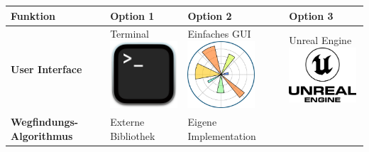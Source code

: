 \documentclass[../main.tex]{subfiles}
\begin{document}
\begin{table}[htbp!]
    \centering
    \begin{tabularx}{\textwidth}{| X | Y | Y | Y |}
        \hline

        \textbf{Funktion} & \textbf{Option 1} & \textbf{Option 2} & \textbf{Option 3} \\ \hline
        
        \textbf{User Interface} &     
        Terminal \newline
        \includegraphics[width=2.5cm]{img/simulation/morphologischer-kasten/terminal.png}
        &
        Einfaches GUI \newline
        \includegraphics[width=2.5cm]{img/simulation/morphologischer-kasten/simple-gui.png}
        &
        Unreal Engine \newline
        \includegraphics[width=2.5cm]{img/simulation/morphologischer-kasten/unreal-engine-logo.png}
        \\ \hline
        
        \textbf{Wegfindungs-Algorithmus}  &
        Externe Bibliothek &
        Eigene Implementation &
        \\ \hline
        

\end{tabularx}
\end{table}
\end{document}
